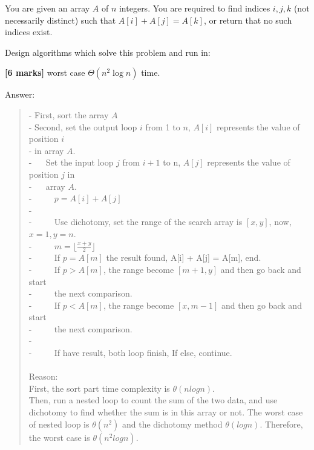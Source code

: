 \documentclass{article}
\begin{document}
\setcounter{question}{1}

\begin{Question}
You are given an array $A$ of $n$ integers. You are required to find indices $i, j, k$ (not necessarily distinct) such that $A[i] + A[j] = A[k]$, or return that no such indices exist.

Design algorithms which solve this problem and run in:

\begin{Subquestion}
\textbf{[6 marks]} worst case $\Theta(n^2 \log n)$ time.

\begin{answer}
Answer:
\begin{quote}
    - First, sort the array $A$\\
    - Second, set the output loop $i$ from 1 to $n$, $A[i]$ represents the value of position $i$\\- in array $A$.\\
    - $\quad$ Set the input loop $j$ from $i + 1$ to n, $A[j]$ represents the value of position $j$ in \\- $\quad$ array $A$.\\
    - $\quad \quad$ $p = A[i] + A[j]$\\
    - $\quad \quad$\\
    - $\quad \quad$ Use dichotomy, set the range of the search array is $[x, y]$, now, $x = 1, y = n$.\\         
    - $\quad \quad$ $m = \displaystyle{\lfloor \frac{x + y}{2}  \rfloor} $\\
    - $\quad \quad$ If $p = A[m]$ the result found, A[i] + A[j] = A[m], end.\\
    - $\quad \quad$ If $p > A[m]$, the range become $[m + 1, y]$ and then go back and start\\- $\quad \quad$ the next comparison.\\
    - $\quad \quad$ If $p < A[m]$, the range become $[x, m - 1]$ and then go back and start\\- $\quad \quad$ the next comparison.\\
    - $\quad \quad$\\
    - $\quad \quad$ If have result, both loop finish, If else, continue.\\\\
    Reason:\\
    First, the sort part time complexity is $\theta(nlogn)$.\\
    Then, run a nested loop to count the sum of the two data, and use dichotomy to find whether the sum is in this array or not. The worst case of nested loop is $\theta(n^2)$ and the dichotomy method $\theta(logn)$. Therefore, the worst case is $\theta(n^2logn)$.\\
\end{quote}
\end{answer}
\end{Subquestion}


\end{Question}
\end{document}
